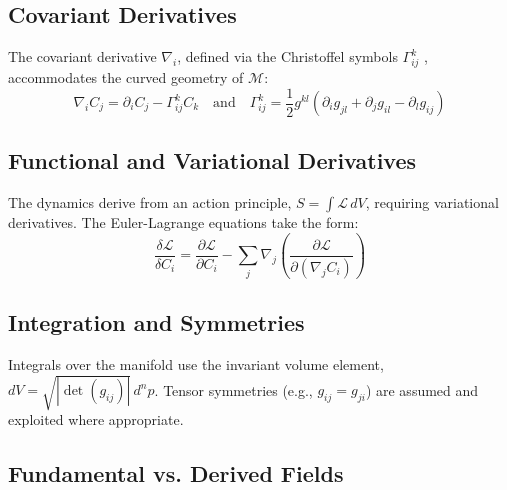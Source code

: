 \subsection{Covariant Derivatives}\label{sec:covariant_derivatives}

The covariant derivative \(\nabla_i\), defined via the Christoffel symbols \(\Gamma^k_{ij}\) \autocite{Christoffel1869}, accommodates the curved geometry of \(\mathcal{M}\):
\begin{equation}
\nabla_i C_j = \partial_i C_j - \Gamma^k_{ij} C_k \quad \text{and} \quad \Gamma^k_{ij} = \frac{1}{2} g^{kl} ( \partial_i g_{jl} + \partial_j g_{il} - \partial_l g_{ij} )
\end{equation}

\subsection{Functional and Variational Derivatives}\label{sec:functional_and_variational_derivatives}

The dynamics derive from an action principle, \(S = \int \mathcal{L} \, dV\), requiring variational derivatives. The Euler-Lagrange equations take the form:
\begin{equation}
\frac{\delta \mathcal{L}}{\delta C_i} = \frac{\partial \mathcal{L}}{\partial C_i} - \sum_j \nabla_j \left( \frac{\partial \mathcal{L}}{\partial (\nabla_j C_i)} \right)
\end{equation}

\subsection{Integration and Symmetries}\label{sec:integration_and_symmetries}

Integrals over the manifold use the invariant volume element, \(dV = \sqrt{|\det(g_{ij})|} \, d^n p\). Tensor symmetries (e.g., \(g_{ij} = g_{ji}\)) are assumed and exploited where appropriate.

\subsection{Fundamental vs. Derived Fields}\label{sec:fundamental_vs_derived_fields}

